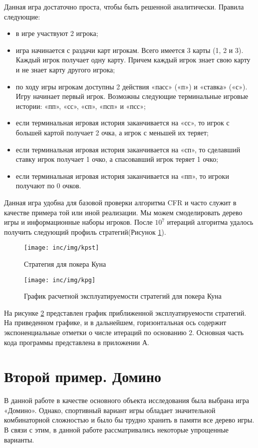 Данная игра достаточно проста, чтобы быть решенной аналитически. Правила следующие:
\begin{itemize}
	\item в игре участвуют 2 игрока;
	\item игра начинается с раздачи карт игрокам. Всего имеется 3 карты (1, 2 и 3). Каждый игрок получает одну карту. Причем каждый игрок знает свою карту и не знает карту другого игрока;
	\item по ходу игры игрокам доступны 2 действия «пасс» («п») и «ставка» («с»). Игру начинает первый игрок. Возможны следующие терминальные игровые истории: «пп», «сс», «сп», «псп» и «псс»;
	\item если терминальная игровая история заканчивается на «сс», то игрок с большей картой получает 2 очка, а игрок с меньшей их теряет;
	\item если терминальная игровая история заканчивается на «сп», то сделавший ставку игрок получает 1 очко, а спасовавший игрок теряет 1 очко;
	\item если терминальная игровая история заканчивается на «пп», то игроки получают по 0 очков.
\end{itemize}
Данная игра удобна для базовой проверки алгоритма CFR и часто служит в качестве примера той или иной реализации. Мы можем смоделировать дерево игры и информационные наборы игроков. После $10^7$ итераций алгоритма удалось получить следующий профиль стратегий(Рисунок \ref{fig:figkpst}).
\begin{figure}[H]
	\centering
	\texttt{[image: inc/img/kpst]}
	\caption{Стратегия для покера Куна}
	\label{fig:figkpst}
\end{figure}
\begin{figure}[H]
	\centering
	\texttt{[image: inc/img/kpg]}
	\caption{График расчетной эксплуатируемости стратегий для покера Куна}
	\label{fig:figkpg}
\end{figure}
\par
На рисунке \ref{fig:figkpg} представлен график приближенной эксплуатируемости стратегий. На приведенном графике, и в дальнейшем, горизонтальная ось содержит экспоненциальные отметки о числе итераций по основанию 2. Основная часть кода программы представлена в приложении А.

\section{Второй пример. Домино}

В данной работе в качестве основного объекта исследования была выбрана игра «Домино». Однако, спортивный вариант игры обладает значительной комбинаторной сложностью и было бы трудно хранить в памяти все дерево игры. В связи с этим, в данной работе рассматривались некоторые упрощенные варианты.

